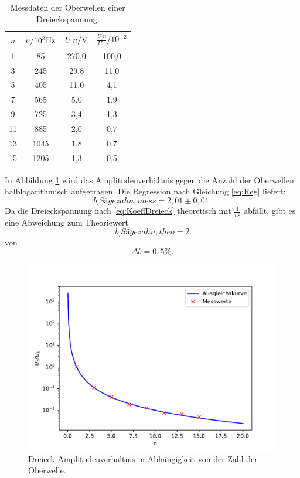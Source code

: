 \begin{table}
	\centering
	\caption{Messdaten der Oberwellen einer Dreieckspannung.}
	\begin{tabular}{S[table-format=2.0] S[table-format=4.0]S[table-format=3.1]S[table-format=3.1]}
		\toprule
		{$n$}&{$\nu/10^3\si[per-mode=reciprocal]{\hertz}$}&{$U_.n/\si[per-mode=reciprocal]{\volt}$}&{$\frac{U_.n}{U_.1}/10^{-2}$} \\
		 & 85 & 270,0 & 100,0 \\
		3 & 245 & 29,8 & 11,0 \\
		5 & 405 & 11,0 & 4,1 \\
		7 & 565 & 5,0 & 1,9 \\
		9 & 725 & 3,4 & 1,3 \\
		11 & 885 & 2,0 & 0,7 \\
		13 & 1045 & 1,8 & 0,7 \\
		15 & 1205 & 1,3 & 0,5 \\
		\bottomrule
	\end{tabular}
	\label{tab:tab3}
\end{table}

\noindent In Abbildung \ref{fig:D} wird das Amplitudenverhältnis gegen die Anzahl der Oberwellen halblogarithmisch aufgetragen. Die Regression nach Gleichung \eqref{eq:Reg} liefert:
\[
b_.{Sägezahn,mess} = 2,01 \pm 0,01\text{.}
\]
Da die Dreieckspannung nach \eqref{eq:KoeffDreieck} theoretisch mit $\frac{1}{n^2}$ abfällt, gibt es eine Abweichung zum Theoriewert
\[
b_.{Sägezahn,theo} = 2
\]
von
\[
\Delta b = 0,5\% \text{.}
\]

\begin{figure}
\centering
\includegraphics[width=\linewidth-75pt,height=\textheight-75pt,keepaspectratio]{content/images/dreieck.pdf}
\caption{Dreieck-Amplitudenverhältnis in Abhängigkeit von der Zahl der Oberwelle.}\label{fig:D}
\end{figure}

